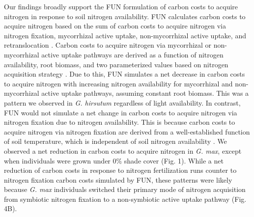 Our findings broadly support the FUN formulation of carbon costs to acquire nitrogen in response to soil nitrogen availability. FUN calculates carbon costs to acquire nitrogen based on the sum of carbon costs to acquire nitrogen via nitrogen fixation, mycorrhizal active uptake, non-mycorrhizal active uptake, and retranslocation . Carbon costs to acquire nitrogen via mycorrhizal or non-mycorrhizal active uptake pathways are derived as a function of nitrogen availability, root biomass, and two parameterized values based on nitrogen acquisition strategy . Due to this, FUN simulates a net decrease in carbon costs to acquire nitrogen with increasing nitrogen availability for mycorrhizal and non-mycorrhizal active uptake pathways, assuming constant root biomass. This was a pattern we observed in \textit{G. hirsutum} regardless of light availability. In contrast, FUN would not simulate a net change in carbon costs to acquire nitrogen via nitrogen fixation due to nitrogen availability. This is because carbon costs to acquire nitrogen via nitrogen fixation are derived from a well-established function of soil temperature, which is independent of soil nitrogen availability . We observed a net reduction in carbon costs to acquire nitrogen in \textit{G. max}, except when individuals were grown under 0\% shade cover (Fig. 1). While a net reduction of carbon costs in response to nitrogen fertilization runs counter to nitrogen fixation carbon costs simulated by FUN, these patterns were likely because \textit{G. max} individuals switched their primary mode of nitrogen acquisition from symbiotic nitrogen fixation to a non-symbiotic active uptake pathway (Fig. 4B).

